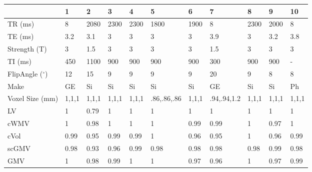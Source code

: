 \begin{table}
[]
\centering
\begin{tabular}{lllllllllll}
\toprule
{} &     1  &     2  &     3  &     4  &                    5  &     6  &                    7  &     8  &     9  &     10 \\
\midrule
TR (ms)                            &      8 &   2080 &   2300 &   2300 &                  1800 &   1900 &                     8 &   2300 &   2000 &      8 \\
TE (ms)                           &    3.2 &    3.1 &      3 &      3 &                     3 &      3 &                   3.9 &      3 &    3.2 &    3.8 \\
Strength (T)                      &      3 &    1.5 &      3 &      3 &                     3 &      3 &                   1.5 &      3 &      3 &      3 \\
TI (ms)                           &    450 &   1100 &    900 &    900 &                   900 &    900 &                   300 &    900 &    900 &      - \\
FlipAngle ($^{\circ}$)                     &     12 &     15 &      9 &      9 &                     9 &      9 &                    20 &      9 &      8 &      8 \\
Make                          &     GE &     Si &     Si &     Si &                    Si &     Si &                    GE &     Si &     Si &     Ph \\
Voxel Size (mm)                   &  1,1,1 &  1,1,1 &  1,1,1 &  1,1,1 &  .86,.86,.86 &  1,1,1 &  .94,.94,1.2 &  1,1,1 &  1,1,1 &  1,1,1 \\
\bottomrule
LV             &      1 &   0.79 &      1 &      1 &                     1 &      1 &                     1 &      1 &      1 &      1 \\
cWMV        &      1 &   0.98 &      1 &      1 &                     1 &   0.99 &                  0.99 &      1 &   0.97 &      1 \\
cVol                   &   0.99 &   0.95 &   0.99 &   0.99 &                     1 &   0.96 &                  0.95 &      1 &   0.96 &   0.99 \\
scGMV                &   0.98 &   0.93 &   0.96 &   0.99 &                  0.98 &   0.98 &                  0.98 &   0.98 &   0.99 &   0.98 \\
GMV                  &      1 &   0.98 &   0.99 &      1 &                     1 &   0.97 &                  0.96 &      1 &   0.97 &   0.99 \\

\end{tabular}
\end{table}
